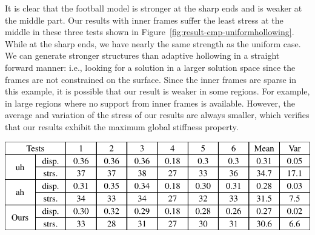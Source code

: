 It is clear that the football model is stronger at the sharp ends and is weaker at the middle part.
Our results with inner frames suffer the least stress at the middle in these three tests shown in Figure~\ref{fig:result-cmp-uniformhollowing}.
While at the sharp ends, we have nearly the same strength as the uniform case.
We can generate stronger structures than adaptive hollowing in a straight forward manner:
i.e., looking for a solution in a larger solution space since the frames are not constrained on the surface.
Since the inner frames are sparse in this example, it is possible that our result is weaker in some regions.
For example, in large regions where no support from inner frames is available.
However, the average and variation of the stress of our results are always smaller, which verifies that our results exhibit the maximum global stiffness property.

\begin{table}[htb]
\caption{\label{tab:result-cmp-uniformhollowing}Comparison of simulation tests with hollowing methods.
         From top to bottom: statistics of uniform hollowing (uh), adaptive hollowing (ah), and our method.
         For each method, we calculate the deformation displacement (disp.) and the stress (strs.) value. The mean and var refer
         to the average and the variation, respectively.}
\centering
\includegraphics[width=\linewidth]{Tables/table3}
\end{table}


